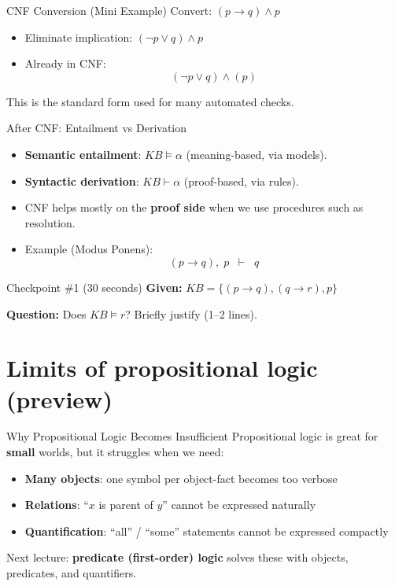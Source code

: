 \documentclass[aspectratio=169]{beamer}
\begin{document}
\begin{frame}{CNF Conversion (Mini Example)}
  Convert: $(p \rightarrow q) \land p$
  \begin{itemize}[<+->]
    \item Eliminate implication: $(\lnot p \lor q) \land p$
    \item Already in CNF:
    \[
      (\lnot p \lor q) \land (p)
    \]
  \end{itemize}
  This is the standard form used for many automated checks.
\end{frame}

\begin{frame}{After CNF: Entailment vs Derivation}
  \begin{itemize}[<+->]
    \item \textbf{Semantic entailment}: $KB \models \alpha$ (meaning-based, via models).
    \item \textbf{Syntactic derivation}: $KB \vdash \alpha$ (proof-based, via rules).
    \item CNF helps mostly on the \textbf{proof side} when we use procedures such as resolution.
    \item Example (Modus Ponens):
    \[
      (p \rightarrow q),\; p \;\;\vdash\;\; q
    \]
  \end{itemize}
\end{frame}

\begin{frame}{Checkpoint \#1 (30 seconds)}
  \textbf{Given:} $KB = \{(p \rightarrow q), (q \rightarrow r), p\}$

  \vspace{0.6em}
  \textbf{Question:} Does $KB \models r$? Briefly justify (1--2 lines).
\end{frame}

\section{Limits of propositional logic (preview)}
\label{sec:limits}

\begin{frame}{Why Propositional Logic Becomes Insufficient}
  Propositional logic is great for \textbf{small} worlds, but it struggles when we need:
  \begin{itemize}[<+->]
    \item \textbf{Many objects}: one symbol per object-fact becomes too verbose
    \item \textbf{Relations}: ``$x$ is parent of $y$'' cannot be expressed naturally
    \item \textbf{Quantification}: ``all'' / ``some'' statements cannot be expressed compactly
  \end{itemize}
  \vspace{0.3em}
  Next lecture: \textbf{predicate (first-order) logic} solves these with objects, predicates, and quantifiers.
\end{frame}
\end{document}
